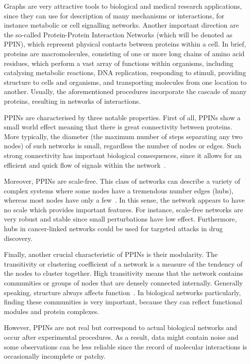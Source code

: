 \documentclass[10pt,twoside]{pnas-new}
\begin{document}
Graphs are very attractive tools to biological and medical research applications, since they can use for description of many mechanisms or interactions, for instance metabolic or cell signalling networks. Another important direction are the so-called Protein-Protein Interaction Networks (which will be denoted as PPIN), which represent physical contacts between proteins within a cell. In brief, 
proteins are macromolecules, consisting of one or more long chains of amino acid residues, which perform a vast array of functions within organisms, including catalysing metabolic reactions, DNA replication, responding to stimuli, providing structure to cells and organisms, and transporting molecules from one location to another. Usually, the aforementioned procedures incorporate the cascade of many proteins, resulting in networks of interactions.

PPINs are characterised by three notable properties. First of all, PPINs show a small world effect meaning that there is great connectivity between proteins. More typically, the diameter (the maximum number of steps separating any two nodes) of such networks is small, regardless the number of nodes or edges. Such strong connectivity has important biological consequences, since it allows for an efficient and quick flow of signals within the network~\cite{PPINtrain}.

Moreover, PPINs are scale-free. This class of networks can describe a variety of complex systems where some nodes have a tremendous number edges (hubs), whereas most nodes have only a few~\cite{barabasi2003scale}. In this sense, the network appears to have no scale which provides important features. For instance, scale-free networks are very robust and stable since small perturbations have low effect. Furthermore, hubs in cancer-linked networks could be used for targeted attacks in drug discovery.

Finally, another crucial characteristic of PPINs is their modularity. The transitivity or clustering coefficient of a network is a measure of the tendency of the nodes to cluster together. High transitivity means that the network contains communities or groups of nodes that are densely connected internally. Generally speaking, structure always affects function~\cite{strogatz2001exploring}. In biological networks particularly, finding these communities is very important, because they can reflect functional modules and protein complexes.

However, PPINs are not real but correspond to actual biological networks and occur after experimental procedures. As a result, data might contain noise and some observations can be less reliable since the record of molecular interactions is occasionally incomplete or patchy.
\end{document}
